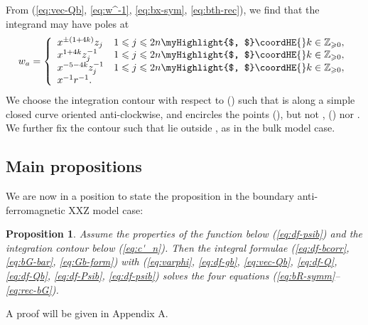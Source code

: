 \documentclass[a4paper,10pt]{article}
\newtheorem{prop}[thm]{Proposition}
\begin{document}
{{}From (\ref{eq:vec-Qb}, \ref{eq:w^-1}, 
\ref{eq:bx-sym}, \ref{eq:bth-rec}), 
we find that the integrand may have poles at 
$$
w_a =\left\{ \begin{array}{ll}
x^{\pm (1+4k)}z_j & 
1\leqslant j\leqslant 2n\myHighlight{$, $}\coordHE{}k\in \mathbb{Z}_{\geqslant 0}, \\
x^{1+4k}z_j^{-1} & 
1\leqslant j\leqslant 2n\myHighlight{$, $}\coordHE{}k\in \mathbb{Z}_{\geqslant 0}, \\
x^{-5-4k}z_j^{-1} & 
1\leqslant j\leqslant 2n\myHighlight{$, $}\coordHE{}k\in \mathbb{Z}_{\geqslant 0}, \\
x^{-1}r^{-1}. & \end{array} \right. 
$$
We choose the integration contour \coordHE{} with 
respect to \coordHE{} (\coordHE{}) such that \coordHE{} is along 
a simple closed curve oriented anti-clockwise, and 
encircles the points \coordHE{} 
(\coordHE{}), 
but not \coordHE{}, \coordHE{} 
(\coordHE{}) 
nor \coordHE{}. We further fix the contour \coordHE{} 
such that \coordHE{} lie outside \coordHE{}, as in the 
bulk model case. 

\subsection{Main propositions}

We are now in a position to state the proposition in 
the boundary anti-ferromagnetic XXZ model case: 

\begin{prop} Assume the properties of 
the function \coordHE{} 
below (\ref{eq:df-psib}) and the integration contour 
\coordHE{} below (\ref{eq:c'_n}). Then the integral formulae 
(\ref{eq:df-bcorr}, \ref{eq:bG-bar}, \ref{eq:Gb-form}) 
with (\ref{eq:varphi}, \ref{eq:df-gb}, \ref{eq:vec-Qb}, 
\ref{eq:df-Q}, \ref{eq:df-Qb}, \ref{eq:df-Psib}, 
\ref{eq:df-psib}) solves the four equations 
(\ref{eq:bR-symm}--\ref{eq:rec-bG}). 
\label{prop:b-qKZ}
\end{prop}

A proof will be given in Appendix A. 

}
\end{document}
